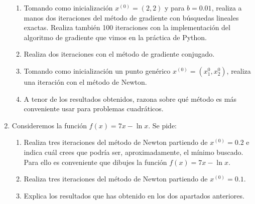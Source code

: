 \begin{enumerate}
	\begin{enumerate}[label=\alph*)]
		\item Tomando como inicialización $x^{(0)}=(2,2)$ y para $b=0.01$, realiza a manos dos iteraciones del método de gradiente con búsquedas lineales exactas. Realiza también 100 iteraciones con la implementación del algoritmo de gradiente que vimos en la práctica de Python.
		\item Realiza dos iteraciones con el método de gradiente conjugado.
		\item Tomando como inicialización un punto genérico $x^{(0)}=(x_1^0,x_2^0)$, realiza una iteración con el método de Newton.
		\item A tenor de los resultados obtenidos, razona sobre qué método es más conveniente usar para problemas cuadráticos.
	\end{enumerate}
	\item Consideremos la función $f(x)=7x-\ln x$. Se pide:
	\begin{enumerate}[label=\alph*)]
		\item Realiza tres iteraciones del método de Newton partiendo de $x^{(0)}=0.2$ e indica cuál crees que podría ser, aproximadamente, el mínimo buscado. Para ello es conveniente que dibujes la función $f(x)=7x-\ln x$.
		\item Realiza tres iteraciones del método de Newton partiendo de $x^{(0)}=0.1$.
		\item Explica los resultados que has obtenido en los dos apartados anteriores.
	\end{enumerate}
\end{enumerate}
